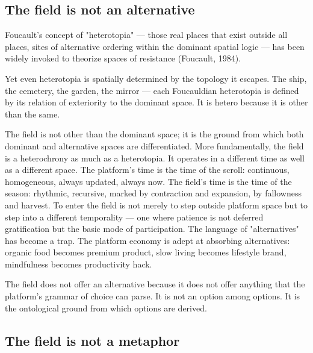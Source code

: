 \subsection{The field is not an alternative}

Foucault's concept of "heterotopia" — those real places that exist outside all places, sites of alternative ordering within the dominant spatial logic — has been widely invoked to theorize spaces of resistance (Foucault, 1984).

Yet even heterotopia is spatially determined by the topology it escapes. The ship, the cemetery, the garden, the mirror — each Foucauldian heterotopia is defined by its relation of exteriority to the dominant space. It is hetero because it is other than the same.

The field is not other than the dominant space; it is the ground from which both dominant and alternative spaces are differentiated. More fundamentally, the field is a heterochrony as much as a heterotopia. It operates in a different time as well as a different space. The platform's time is the time of the scroll: continuous, homogeneous, always updated, always now. The field's time is the time of the season: rhythmic, recursive, marked by contraction and expansion, by fallowness and harvest. To enter the field is not merely to step outside platform space but to step into a different temporality — one where patience is not deferred gratification but the basic mode of participation. The language of "alternatives" has become a trap. The platform economy is adept at absorbing alternatives: organic food becomes premium product, slow living becomes lifestyle brand, mindfulness becomes productivity hack.

The field does not offer an alternative because it does not offer anything that the platform's grammar of choice can parse. It is not an option among options. It is the ontological ground from which options are derived.

\subsection{The field is not a metaphor}

